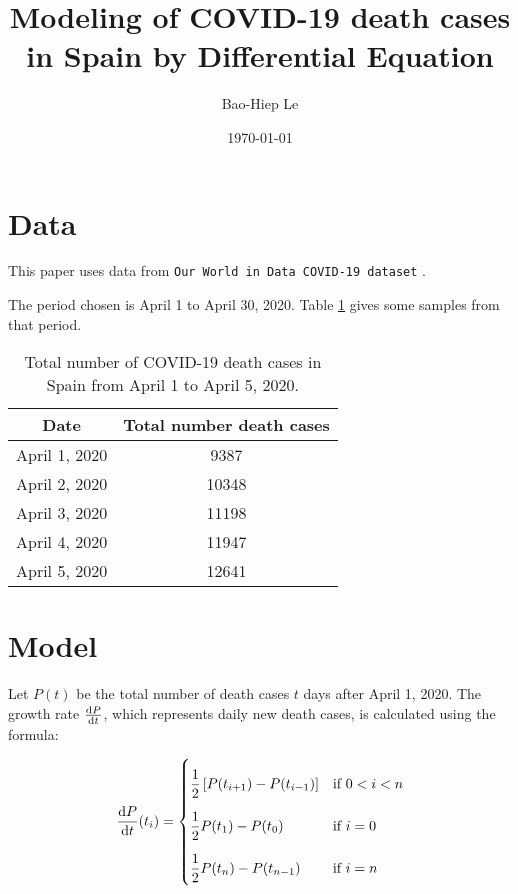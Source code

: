 \documentclass[12pt]{article}
\title{Modeling of COVID-19 death cases in Spain by Differential Equation}
\author{Bao-Hiep Le}
\date{\today}
\begin{document}
\maketitle


\section*{Data}

This paper uses data from \texttt{Our World in Data COVID-19 dataset} \autocite{owid-covid-data}.

The period chosen is April 1 to April 30, 2020. Table \ref{table:1} gives some samples from that period.

\begin{table}[h!]
\centering
\begin{tabular}{ |c|c| }
  \hline
  \textbf{Date} & \textbf{Total number death cases} \\
  \hline
  April 1, 2020 & 9387 \\
  April 2, 2020 & 10348 \\
  April 3, 2020 & 11198 \\
  April 4, 2020 & 11947 \\
  April 5, 2020 & 12641 \\
  \hline
\end{tabular}
\caption{Total number of COVID-19 death cases in Spain from April 1 to April 5, 2020.}
\label{table:1}
\end{table}

\section*{Model}

Let $P(t)$ be the total number of death cases $t$ days after April 1, 2020.
The growth rate $\diff{P}{t}$, which represents daily new death cases,
is calculated using the formula:

\begin{align} \label{rate_formula}
\diff{P}{t}(t_i) =
\renewcommand{\arraystretch}{2.5}\left\{\begin{array}{@{}l@{\quad}l@{}}
  \dfrac{1}{2} \left [ P(t_{i + 1}) - P(t_{i - 1}) \right ] &\text{if } 0 < i < n \\
  \dfrac{1}{2} P(t_{1}) - P(t_{0}) &\text{if } i = 0 \\
  \dfrac{1}{2} P(t_{n}) - P(t_{n - 1}) &\text{if } i = n \\
\end{array}\right.\kern-\nulldelimiterspace
\end{align}
\end{document}
